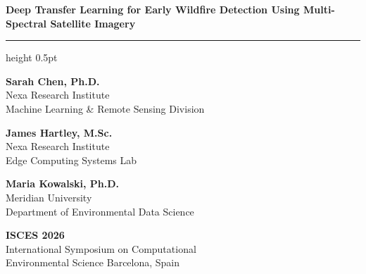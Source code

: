 \documentclass[10pt]{article}
\newlength{\panelwidth}
\begin{document}

\noindent
\begin{minipage}[t]{\panelwidth}
  \RaggedRight

  \vspace{10pt}

  {\fontsize{13}{16}\selectfont\bfseries\color{primary}
   Deep Transfer Learning for Early Wildfire Detection Using Multi-Spectral Satellite Imagery}

  \vspace{10pt}

  {\color{secondary}\hrule height 0.5pt}
  \vspace{8pt}

  {\small\bfseries\color{darktext}Sarah Chen, Ph.D.}\\[1pt]
  {\footnotesize\color{softgray}Nexa Research Institute\\
  Machine Learning \& Remote Sensing Division}

  \vspace{4pt}

  {\small\bfseries\color{darktext}James Hartley, M.Sc.}\\[1pt]
  {\footnotesize\color{softgray}Nexa Research Institute\\
  Edge Computing Systems Lab}

  \vspace{4pt}

  {\small\bfseries\color{darktext}Maria Kowalski, Ph.D.}\\[1pt]
  {\footnotesize\color{softgray}Meridian University\\
  Department of Environmental Data Science}

  \vspace{10pt}

  \begin{highlightbox}
    {\footnotesize\bfseries\color{primary}ISCES 2026}\\[1pt]
    {\scriptsize\color{softgray}International Symposium on Computational\\
    Environmental Science {\textbullet} Barcelona, Spain}
  \end{highlightbox}


\end{minipage}
\end{document}
